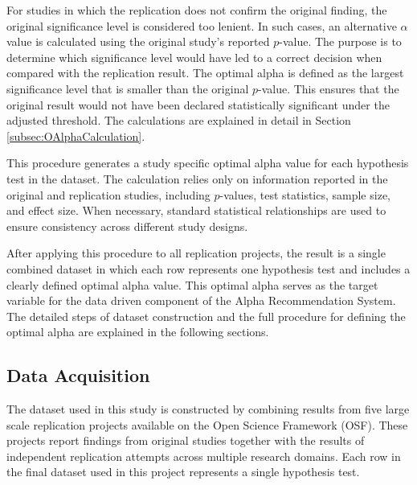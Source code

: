 For studies in which the replication does not confirm the original finding, the original significance level is considered too lenient. In such cases, an alternative $\alpha$ value is calculated using the original study’s reported $p$-value. The purpose is to determine which significance level would have led to a correct decision when compared with the replication result. The optimal alpha is defined as the largest significance level that is smaller than the original $p$-value. This ensures that the original result would not have been declared statistically significant under the adjusted threshold. The calculations are explained in detail in Section \ref{subsec:OAlphaCalculation}.

This procedure generates a study specific optimal alpha value for each hypothesis test in the dataset. The calculation relies only on information reported in the original and replication studies, including $p$-values, test statistics, sample size, and effect size. When necessary, standard statistical relationships are used to ensure consistency across different study designs.

After applying this procedure to all replication projects, the result is a single combined dataset in which each row represents one hypothesis test and includes a clearly defined optimal alpha value. This optimal alpha serves as the target variable for the data driven component of the Alpha Recommendation System. The detailed steps of dataset construction and the full procedure for defining the optimal alpha are explained in the following sections.

\subsection{Data Acquisition}

The dataset used in this study is constructed by combining results from five large scale replication projects available on the Open Science Framework (OSF). These projects report findings from original studies together with the results of independent replication attempts across multiple research domains\cite{FosterDeardorff2017}. Each row in the final dataset used in this project represents a single hypothesis test.


